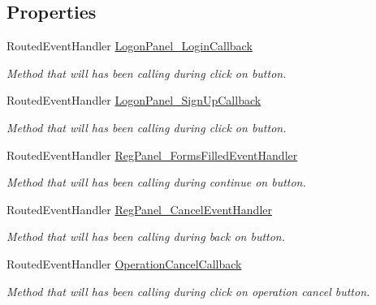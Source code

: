 \subsection*{Properties}
\begin{DoxyCompactItemize}
\item 
Routed\+Event\+Handler \mbox{\hyperlink{class_wpf_handler_1_1_u_i_1_1_controls_1_1_logon_1_1_logon_screen_ab0f03636283e80be841cd0d1b9e5b444}{Logon\+Panel\+\_\+\+Login\+Callback}}
\begin{DoxyCompactList}\small\item\em Method that will has been calling during click on button. \end{DoxyCompactList}\item 
Routed\+Event\+Handler \mbox{\hyperlink{class_wpf_handler_1_1_u_i_1_1_controls_1_1_logon_1_1_logon_screen_aac3aa6eacab257ae3ddf0500773b70df}{Logon\+Panel\+\_\+\+Sign\+Up\+Callback}}
\begin{DoxyCompactList}\small\item\em Method that will has been calling during click on button. \end{DoxyCompactList}\item 
Routed\+Event\+Handler \mbox{\hyperlink{class_wpf_handler_1_1_u_i_1_1_controls_1_1_logon_1_1_logon_screen_af2511d9a09e761ab80c154a36052e30d}{Reg\+Panel\+\_\+\+Forms\+Filled\+Event\+Handler}}
\begin{DoxyCompactList}\small\item\em Method that will has been calling during continue on button. \end{DoxyCompactList}\item 
Routed\+Event\+Handler \mbox{\hyperlink{class_wpf_handler_1_1_u_i_1_1_controls_1_1_logon_1_1_logon_screen_a5216599ea89bfa7ce9982e6233a9ab0c}{Reg\+Panel\+\_\+\+Cancel\+Event\+Handler}}
\begin{DoxyCompactList}\small\item\em Method that will has been calling during back on button. \end{DoxyCompactList}\item 
Routed\+Event\+Handler \mbox{\hyperlink{class_wpf_handler_1_1_u_i_1_1_controls_1_1_logon_1_1_logon_screen_a1ba7ce314f41c7dc1575024f56ffbab7}{Operation\+Cancel\+Callback}}
\begin{DoxyCompactList}\small\item\em Method that will has been calling during click on operation cancel button. \end{DoxyCompactList}\item 

\end{DoxyCompactItemize}
